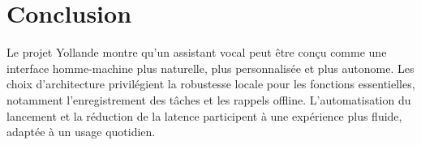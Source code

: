 \documentclass[12pt,a4paper]{report}
\begin{document}
\chapter{Conclusion}

Le projet Yollande montre qu'un assistant vocal peut être conçu comme une
interface homme-machine plus naturelle, plus personnalisée et plus autonome.
Les choix d'architecture privilégient la robustesse locale pour les fonctions
essentielles, notamment l'enregistrement des tâches et les rappels offline.
L'automatisation du lancement et la réduction de la latence participent à une
expérience plus fluide, adaptée à un usage quotidien.
\end{document}
